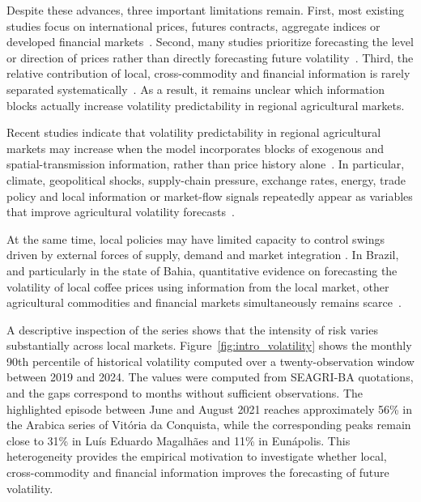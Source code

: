 \documentclass[a4paper,fleqn]{cas-sc}
\begin{document}
Despite these advances, three important limitations remain. First, most existing studies focus on international prices, futures contracts, aggregate indices or developed financial markets~\citep{Zhou2026CommodityConnectedness,Pandit2024CEEMDANTDNN,Brun2026GARCHCoffeeRisk}. Second, many studies prioritize forecasting the level or direction of prices rather than directly forecasting future volatility~\citep{Jin2024CoffeePriceML,Chaovanapoonphol2023CoffeeGARCHX,AliagaMiranda2026CoffeeShocks}. Third, the relative contribution of local, cross-commodity and financial information is rarely separated systematically~\citep{manogna2025dynamicnexus}. As a result, it remains unclear which information blocks actually increase volatility predictability in regional agricultural markets.

Recent studies indicate that volatility predictability in regional agricultural markets may increase when the model incorporates blocks of exogenous and spatial-transmission information, rather than price history alone~\citep{S2211912425000598}. In particular, climate, geopolitical shocks, supply-chain pressure, exchange rates, energy, trade policy and local information or market-flow signals repeatedly appear as variables that improve agricultural volatility forecasts~\citep{S0275531925003897,105028567345,85215790860,105017333758}.

At the same time, local policies may have limited capacity to control swings driven by external forces of supply, demand and market integration \citep{Fahmi2023LocalCoffeePolicy,AliagaMiranda2026CoffeeShocks}. In Brazil, and particularly in the state of Bahia, quantitative evidence on forecasting the volatility of local coffee prices using information from the local market, other agricultural commodities and financial markets simultaneously remains scarce~\citep{85215790860,105014742301}.

A descriptive inspection of the series shows that the intensity of risk varies substantially across local markets. Figure~\ref{fig:intro_volatility} shows the monthly 90th percentile of historical volatility computed over a twenty-observation window between 2019 and 2024. The values were computed from SEAGRI-BA quotations, and the gaps correspond to months without sufficient observations. The highlighted episode between June and August 2021 reaches approximately 56\% in the Arabica series of Vitória da Conquista, while the corresponding peaks remain close to 31\% in Luís Eduardo Magalhães and 11\% in Eunápolis. This heterogeneity provides the empirical motivation to investigate whether local, cross-commodity and financial information improves the forecasting of future volatility.
\end{document}
